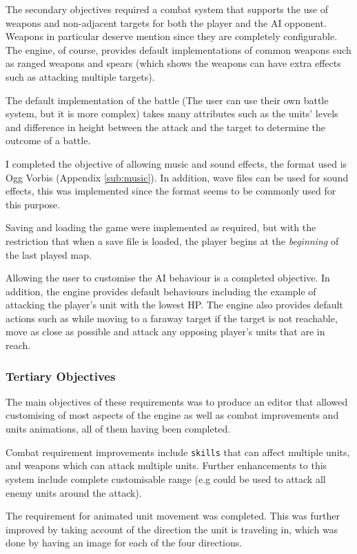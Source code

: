 The secondary objectives required a combat system that supports the use of weapons and non-adjacent targets for both the player and the AI opponent. Weapons in particular deserve  mention since they are completely configurable. The engine, of course, provides default implementations of common weapons such as ranged weapons and spears (which shows the weapons can have extra effects such as attacking multiple targets). 

The default implementation  of the battle (The user can use their own battle system, but it is more complex) takes many attributes such as the units' levels and difference in height between the attack and the target to determine the outcome of a battle. 

I completed the objective of allowing music and sound effects, the format used is Ogg Vorbis (Appendix \ref{sub:music}). In addition, wave files can be used for sound effects, this was implemented since the format seems to be commonly used for this purpose.

Saving and loading the game were implemented as required, but with the restriction that when a save file is loaded, the player begins at the \emph{beginning} of the last played map.

Allowing the user to customise the AI behaviour is a completed objective. In addition, the engine provides default behaviours including the example of attacking the player's unit with the lowest HP. The engine also provides default actions such as while moving to a faraway target if the target is not reachable, move as close as possible and attack any opposing player's units that are in reach. 

\subsubsection{Tertiary Objectives}
The main objectives of these requirements was to produce an editor that allowed customising of most aspects of the engine as well as combat improvements and units animations, all of them having been completed. 

Combat requirement improvements include \texttt{skills} that can affect multiple units, and weapons which can attack multiple units. Further enhancements to this system include complete customisable range (e.g could be used to attack all enemy units around the attack).

The requirement for animated unit movement was completed. This was further improved by taking account of the direction the unit is traveling in, which was done by having an  image for each of the four directions. 

